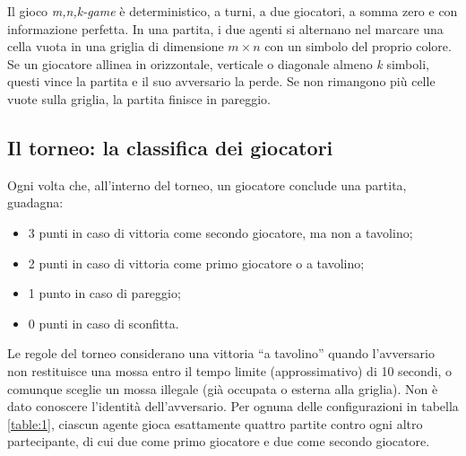 \documentclass{article}
\begin{document}
Il gioco \emph{m,n,k-game} è deterministico, a turni, a due giocatori, a somma
zero e con informazione perfetta. In una partita, i due agenti si alternano nel
marcare una cella vuota in una griglia di dimensione $m\times n$ con un simbolo
del proprio colore. Se un giocatore allinea in orizzontale, verticale o
diagonale almeno \emph{k} simboli, questi vince la partita e il suo avversario
la perde. Se non rimangono più celle vuote sulla griglia, la partita finisce
in pareggio.

\subsection{Il torneo: la classifica dei giocatori} \label{tournament}

Ogni volta che, all'interno del torneo, un giocatore conclude una partita,
guadagna: 
\begin{itemize}
  \item 3 punti in caso di vittoria come secondo giocatore, ma non a
    tavolino;
  \item 2 punti in caso di vittoria come primo giocatore o a tavolino;
  \item 1 punto in caso di pareggio;
  \item 0 punti in caso di sconfitta.
\end{itemize}

\noindent
Le regole del torneo considerano una vittoria ``a tavolino'' quando l'avversario
non restituisce una mossa entro il tempo limite (approssimativo) di 10 secondi,
o comunque sceglie un mossa illegale (già occupata o esterna alla griglia). Non
è dato conoscere l'identità dell'avversario. Per ognuna delle configurazioni in
tabella \ref{table:1}, ciascun agente gioca esattamente quattro partite contro
ogni altro partecipante, di cui due come primo giocatore e due come secondo
giocatore.
\end{document}
